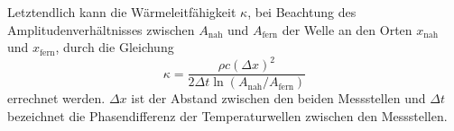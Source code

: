 Letztendlich kann die Wärmeleitfähigkeit $\kappa$, bei Beachtung des Amplitudenverhältnisses zwischen $A_{\text{nah}}$ und $A_{\text{fern}}$ der Welle an den Orten $x_{\text{nah}}$ und $x_{\text{fern}}$, durch die Gleichung
\begin{equation}
    \kappa =\frac{\rho c (\Delta x)^2}{2 \Delta t \ln \left(A_{\text{nah}}/A_{\text{fern}}\right)}
\label{eqn:kappa}
\end{equation}
errechnet werden.
$\Delta x$ ist der Abstand zwischen den beiden Messstellen und $\Delta t$ bezeichnet die Phasendifferenz der Temperaturwellen zwischen den Messstellen.



